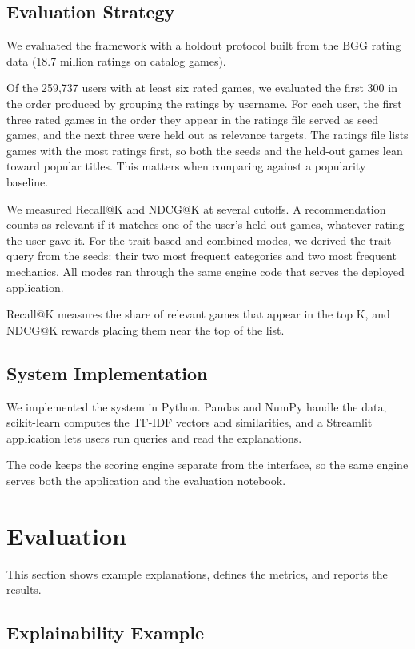 \documentclass[conference]{IEEEtran}
\begin{document}
\subsection{Evaluation Strategy}
\label{sec:evalstrategy}

We evaluated the framework with a holdout protocol built from the BGG rating data (18.7 million ratings on catalog games).

Of the 259,737 users with at least six rated games, we evaluated the first 300 in the order produced by grouping the ratings by username. For each user, the first three rated games in the order they appear in the ratings file served as seed games, and the next three were held out as relevance targets. The ratings file lists games with the most ratings first, so both the seeds and the held-out games lean toward popular titles. This matters when comparing against a popularity baseline.

We measured Recall@K and NDCG@K at several cutoffs. A recommendation counts as relevant if it matches one of the user's held-out games, whatever rating the user gave it. For the trait-based and combined modes, we derived the trait query from the seeds: their two most frequent categories and two most frequent mechanics. All modes ran through the same engine code that serves the deployed application.

Recall@K measures the share of relevant games that appear in the top K, and NDCG@K rewards placing them near the top of the list.

\subsection{System Implementation}

We implemented the system in Python. Pandas and NumPy handle the data, scikit-learn computes the TF-IDF vectors and similarities, and a Streamlit application lets users run queries and read the explanations.

The code keeps the scoring engine separate from the interface, so the same engine serves both the application and the evaluation notebook.

\section{Evaluation}

This section shows example explanations, defines the metrics, and reports the results.

\subsection{Explainability Example}
\end{document}

